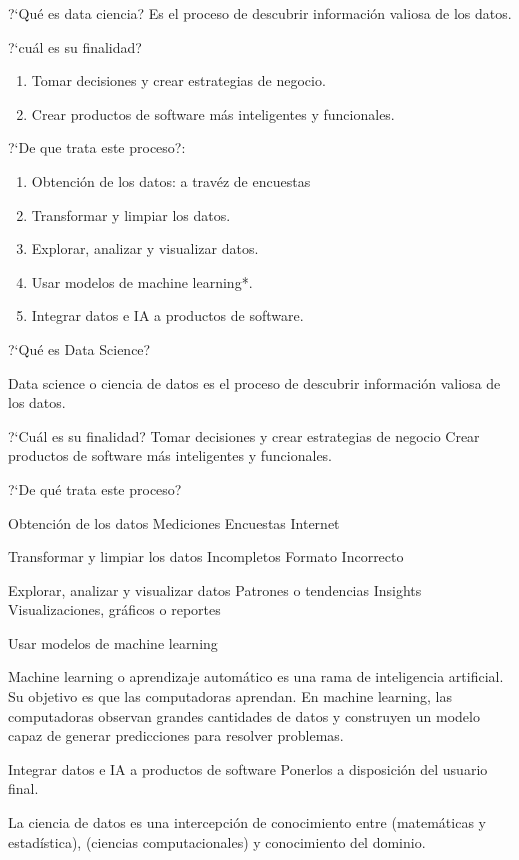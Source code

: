 ?`Qu\'e es data ciencia?
Es el proceso de descubrir informaci\'on valiosa de los datos.

?`cu\'al es su finalidad?

\begin{enumerate}
	\item Tomar decisiones y crear estrategias de negocio.
	\item Crear productos de software m\'as inteligentes y funcionales.
\end{enumerate}

?`De que trata este proceso?:
\begin{enumerate}
	\item Obtenci\'on de los datos: a trav\'ez de encuestas
	\item Transformar y limpiar los datos.
	\item Explorar, analizar y visualizar datos.
	\item Usar modelos de machine learning*.
	\item Integrar datos e IA a productos de software.
\end{enumerate}




?`Qu\'e es Data Science?

Data science o ciencia de datos es el proceso de descubrir informaci\'on valiosa de los datos.

?`Cu\'al es su finalidad?
Tomar decisiones y crear estrategias de negocio
Crear productos de software m\'as inteligentes y funcionales.

?`De qu\'e trata este proceso?

Obtenci\'on de los datos
Mediciones
Encuestas
Internet

Transformar y limpiar los datos
Incompletos
Formato Incorrecto

Explorar, analizar y visualizar datos
Patrones o tendencias
Insights
Visualizaciones, gr\'aficos o reportes

Usar modelos de machine learning

Machine learning o aprendizaje autom\'atico es una rama de inteligencia artificial. Su objetivo es que las computadoras aprendan. En machine learning, las computadoras observan grandes cantidades de datos y construyen un modelo capaz de generar predicciones para resolver problemas.

Integrar datos e IA a productos de software
Ponerlos a disposici\'on del usuario final.


La ciencia de datos es una intercepci\'on de conocimiento entre (matem\'aticas y estad\'istica), (ciencias computacionales)  y conocimiento del dominio.

